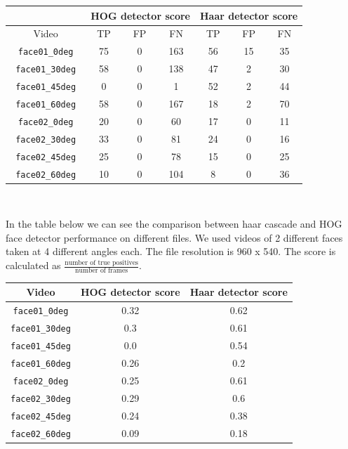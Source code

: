 \documentclass[12pt,a4paper]{article}
\begin{document}
	
	\begin{center}
		\begin{tabular}{|c|c|c|c|c|c|c|}
			\hline 
			& \multicolumn{3}{c|}{HOG detector score} & \multicolumn{3}{c|}{Haar detector score} \\
			\hline
			Video & TP & FP & FN & TP & FP & FN \\
			\hline 
			\texttt{ face01\_0deg } & 75 & 0 & 163 & 56 & 15 & 35 \\
			\texttt{ face01\_30deg } & 58 & 0 & 138 & 47 & 2 & 30 \\
			\texttt{ face01\_45deg } & 0 & 0 & 1 & 52 & 2 & 44 \\
			\texttt{ face01\_60deg } & 58 & 0 & 167 & 18 & 2 & 70 \\
			\texttt{ face02\_0deg } & 20 & 0 & 60 & 17 & 0 & 11 \\
			\texttt{ face02\_30deg } & 33 & 0 & 81 & 24 & 0 & 16 \\
			\texttt{ face02\_45deg } & 25 & 0 & 78 & 15 & 0 & 25 \\
			\texttt{ face02\_60deg } & 10 & 0 & 104 & 8 & 0 & 36 \\			
			\hline 
		\end{tabular} \\
	\end{center}
	
	In the table below we can see the comparison between haar cascade and HOG face detector performance on different files. We used videos of 2 different faces taken at 4 different angles each. The file resolution is 960 x 540. The score is calculated as $\frac{\text{number of true positives}}{\text{number of frames}}$.
	
	\begin{center}
			\begin{tabular}{|c|c|c|}
			\hline 
			Video & HOG detector score & Haar detector score \\
			\hline
			\texttt{face01\_0deg} & 0.32 & 0.62 \\
			\texttt{face01\_30deg} & 0.3 & 0.61 \\
			\texttt{face01\_45deg} & 0.0 & 0.54 \\
			\texttt{face01\_60deg} & 0.26 & 0.2 \\
			\texttt{face02\_0deg} & 0.25 & 0.61 \\
			\texttt{face02\_30deg} & 0.29 & 0.6 \\
			\texttt{face02\_45deg} & 0.24 & 0.38 \\
			\texttt{face02\_60deg} & 0.09 & 0.18 \\
			\hline 
		\end{tabular} \\
	\end{center}
\end{document}
